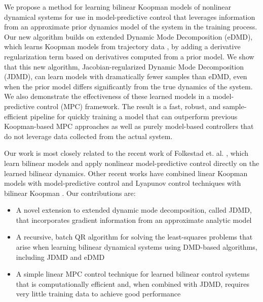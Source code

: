 \documentclass{article}
\begin{document}
We propose a method for learning bilinear Koopman models  of nonlinear
dynamical systems for use in model-predictive control that leverages information from an
approximate prior dynamics model of the system in the training process.  Our new algorithm
builds on extended Dynamic Mode Decomposition (eDMD), which learns Koopman models from
trajectory data \cite{Meduri2022,Bruder2021,Korda2018,Folkestad2020,Suh2020}, by adding a
derivative regularization term based on derivatives computed from a prior model.  We show
that this new algorithm, Jacobian-regularized Dynamic Mode Decomposition (JDMD), can learn
models with dramatically fewer samples than eDMD, even when the prior model differs
significantly from the true dynamics of the system.  We also demonstrate the effectiveness
of these learned models in a model-predictive control (MPC) framework.
The result is a fast, robust, and sample-efficient pipeline for quickly training a model
that can outperform previous Koopman-based MPC approaches as well as purely model-based
controllers that do not leverage data collected from the actual system.

Our work is most closely related to the recent work of Folkestad et. al.
\cite{Folkestad2020,Folkestad2021,Folkestad2021a}, which learn bilinear models and apply
nonlinear model-predictive control directly on the learned bilinear dynamics. Other recent
works have combined linear Koopman models with model-predictive control \cite{Korda2018} and
Lyapunov control techniques with bilinear Koopman \cite{Narasingam2022}. Our contributions
are:

\begin{itemize}
  \item A novel extension to extended dynamic mode decomposition, called JDMD, that
  incorporates gradient information from an approximate analytic model
  
  \item A recursive, batch QR algorithm for solving the least-squares problems that arise 
  when learning bilinear dynamical systems using DMD-based algorithms, including JDMD and eDMD
  
  \item A simple linear MPC control technique for learned bilinear control systems that is
  computationally efficient and, when combined with JDMD, requires very little training data
  to achieve good performance
\end{itemize}
\end{document}
